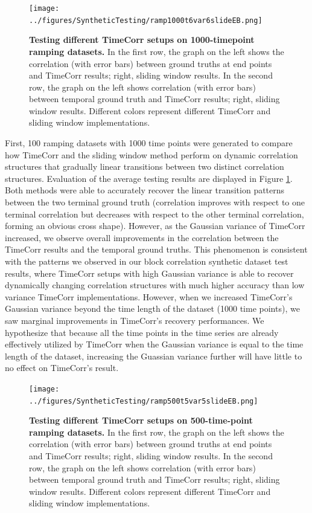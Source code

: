 \documentclass[11pt]{article}
\begin{document}
\begin{enumerate}
\begin{figure}[!htb]
\texttt{[image: ../figures/SyntheticTesting/ramp1000t6var6slideEB.png]}
\caption{\textbf{Testing different TimeCorr setups on 1000-timepoint ramping datasets.} In the first row, the graph on the left shows the correlation (with error bars) between ground truths at end points and TimeCorr results; right, sliding window results. In the second row, the graph on the left shows correlation (with error bars) between temporal ground truth and TimeCorr results; right, sliding window results. Different colors represent different TimeCorr and sliding window implementations.}
\label{fig:ramp1000t4var}
\end{figure}

First, 100 ramping datasets with 1000 time points were generated to compare how TimeCorr and the sliding window method perform on dynamic correlation structures that gradually linear transitions between two distinct correlation structures. Evaluation of the average testing results are displayed in Figure \ref{fig:ramp1000t4var}. Both methods were able to accurately recover the linear transition patterns between the two terminal ground truth (correlation improves with respect to one terminal correlation but decreases with respect to the other terminal correlation, forming an obvious cross shape). However, as the Gaussian variance of TimeCorr increased, we observe overall improvements in the correlation between the TimeCorr results and the temporal ground truths. This phenomenon is consistent with the patterns we observed in our block correlation synthetic dataset test results, where TimeCorr setups with high Gaussian variance is able to recover dynamically changing correlation structures with much higher accuracy than low variance TimeCorr implementations. However, when we increased TimeCorr's Gaussian variance beyond the time length of the dataset (1000 time points), we saw marginal improvements in TimeCorr's recovery performances. We hypothesize that because all the time points in the time series are already effectively utilized by TimeCorr when the Gaussian variance is equal to the time length of the dataset, increasing the Guassian variance further will have little to no effect on TimeCorr's result.


\begin{figure}[!htb]
\texttt{[image: ../figures/SyntheticTesting/ramp500t5var5slideEB.png]}
\caption{\textbf{Testing different TimeCorr setups on 500-time-point ramping datasets.} In the first row, the graph on the left shows the correlation (with error bars) between ground truths at end points and TimeCorr results; right, sliding window results. In the second row, the graph on the left shows correlation (with error bars) between temporal ground truth and TimeCorr results; right, sliding window results. Different colors represent different TimeCorr and sliding window implementations.}
\label{fig:ramp500t4var}
\end{figure}


\end{enumerate}
\end{document}
